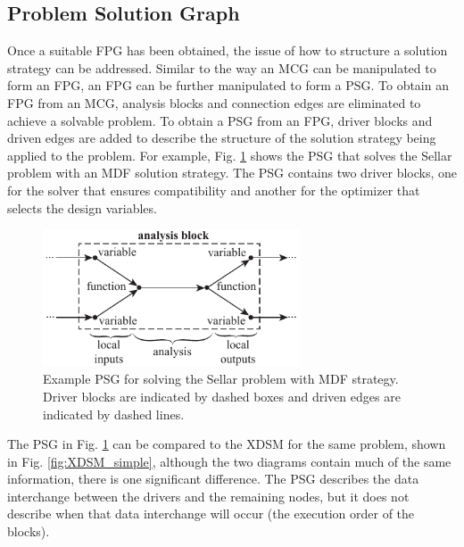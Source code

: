 \subsection{Problem Solution Graph}
Once a suitable FPG has been obtained, the issue of how to structure a solution strategy 
can be addressed. Similar to the way an MCG can be manipulated to form an FPG, an FPG can be
further manipulated to form a PSG. To obtain an FPG from an MCG, analysis blocks and
connection edges are eliminated to achieve a solvable problem. To obtain a PSG from an FPG, driver blocks and driven edges are added to describe the structure of the solution strategy being applied 
to the problem. For example, Fig. \ref{f:sellar_psg} shows the PSG that solves the Sellar problem 
with an MDF solution strategy. The PSG contains two driver blocks, one for the solver that 
ensures compatibility and another for the optimizer that selects the design variables. 
\begin{figure}[htb]
    \begin{center}
    \includegraphics[width=3.0in]{images/sellar_mdf_psg}
    \end{center}
    \vspace{-10pt}
    \caption{Example PSG for solving the Sellar problem with MDF strategy. Driver blocks are indicated by dashed boxes and driven edges are indicated by dashed lines.}
    \label{f:sellar_psg}
\end{figure}

The PSG in Fig. \ref{f:sellar_psg} can be compared to the XDSM for the same problem, shown 
in Fig. \ref{fig:XDSM_simple}, although the two diagrams contain much of the same information, 
there is one significant difference. The PSG describes the data interchange between 
the drivers and the remaining nodes, but it does not describe when that data interchange 
will occur (the execution order of the blocks). 

